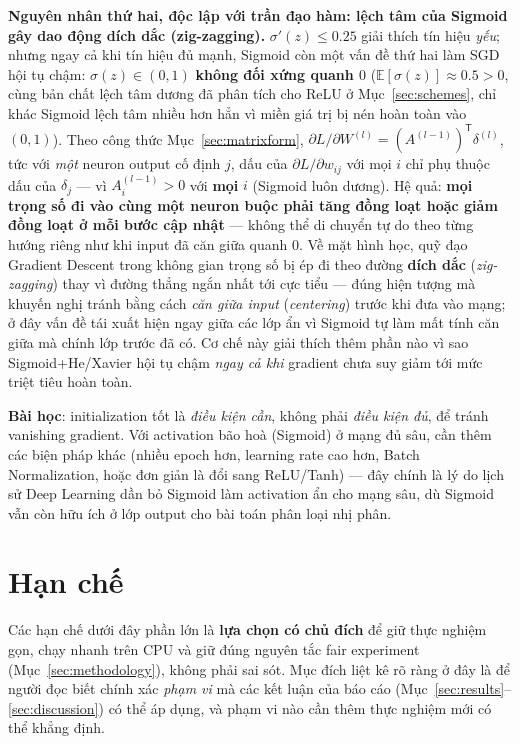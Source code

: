 \documentclass[12pt,a4paper]{report}
\newcommand{\en}[1]{\textit{#1}}
\newcommand{\T}{^{\mathsf{T}}}
\begin{document}
\textbf{Nguyên nhân thứ hai, độc lập với trần đạo hàm: lệch tâm của
Sigmoid gây dao động dích dắc (zig-zagging).} $\sigma'(z)\le0.25$ giải
thích tín hiệu \emph{yếu}; nhưng ngay cả khi tín hiệu đủ mạnh, Sigmoid còn
một vấn đề thứ hai làm SGD hội tụ chậm: $\sigma(z)\in(0,1)$
\textbf{không đối xứng quanh $0$} ($\mathbb E[\sigma(z)]\approx0.5>0$,
cùng bản chất lệch tâm dương đã phân tích cho ReLU ở Mục~\ref{sec:schemes},
chỉ khác Sigmoid lệch tâm nhiều hơn hẳn vì miền giá trị bị nén hoàn toàn
vào $(0,1)$). Theo công thức Mục~\ref{sec:matrixform},
$\partial L/\partial W^{(l)}=(A^{(l-1)})\T\delta^{(l)}$, tức với \emph{một}
neuron output cố định $j$, dấu của $\partial L/\partial w_{ij}$ với mọi
$i$ chỉ phụ thuộc dấu của $\delta_j$ --- vì $A^{(l-1)}_{i}>0$ với
\textbf{mọi} $i$ (Sigmoid luôn dương). Hệ quả: \textbf{mọi trọng số đi vào
cùng một neuron buộc phải tăng đồng loạt hoặc giảm đồng loạt ở mỗi bước
cập nhật} --- không thể di chuyển tự do theo từng hướng riêng như khi input
đã căn giữa quanh $0$. Về mặt hình học, quỹ đạo Gradient Descent trong
không gian trọng số bị ép đi theo đường \textbf{dích dắc}
(\en{zig-zagging}) thay vì đường thẳng ngắn nhất tới cực tiểu --- đúng
hiện tượng mà \citet{lecun1998efficient} khuyến nghị tránh bằng cách
\emph{căn giữa input} (\en{centering}) trước khi đưa vào mạng; ở đây vấn
đề tái xuất hiện ngay giữa các lớp ẩn vì Sigmoid tự làm mất tính căn giữa
mà chính lớp trước đã có. Cơ chế này giải thích thêm phần nào vì sao
Sigmoid+He/Xavier hội tụ chậm \emph{ngay cả khi} gradient chưa suy giảm
tới mức triệt tiêu hoàn toàn.

\textbf{Bài học}: initialization tốt là \emph{điều kiện cần}, không phải
\emph{điều kiện đủ}, để tránh vanishing gradient. Với activation bão hoà
(Sigmoid) ở mạng đủ sâu, cần thêm các biện pháp khác (nhiều epoch hơn,
learning rate cao hơn, Batch Normalization, hoặc đơn giản là đổi sang
ReLU/Tanh) --- đây chính là lý do lịch sử Deep Learning dần bỏ Sigmoid làm
activation ẩn cho mạng sâu, dù Sigmoid vẫn còn hữu ích ở lớp output cho
bài toán phân loại nhị phân.

\section{Hạn chế}
\label{sec:limitations}

Các hạn chế dưới đây phần lớn là \textbf{lựa chọn có chủ đích} để giữ thực
nghiệm gọn, chạy nhanh trên CPU và giữ đúng nguyên tắc fair experiment
(Mục~\ref{sec:methodology}), không phải sai sót. Mục đích liệt kê rõ ràng
ở đây là để người đọc biết chính xác \emph{phạm vi} mà các kết luận của
báo cáo (Mục~\ref{sec:results}--\ref{sec:discussion}) có thể áp dụng, và
phạm vi nào cần thêm thực nghiệm mới có thể khẳng định.
\end{document}
